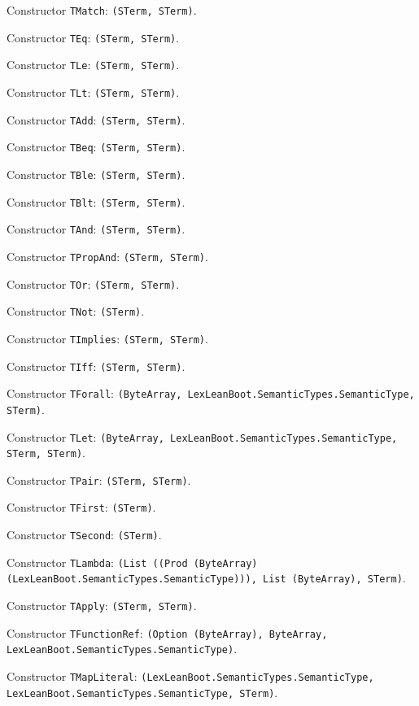 \documentclass[11pt]{article}
\begin{document}
\noindent Constructor \texttt{TMatch}: \texttt{(STerm, STerm)}.\par
\noindent Constructor \texttt{TEq}: \texttt{(STerm, STerm)}.\par
\noindent Constructor \texttt{TLe}: \texttt{(STerm, STerm)}.\par
\noindent Constructor \texttt{TLt}: \texttt{(STerm, STerm)}.\par
\noindent Constructor \texttt{TAdd}: \texttt{(STerm, STerm)}.\par
\noindent Constructor \texttt{TBeq}: \texttt{(STerm, STerm)}.\par
\noindent Constructor \texttt{TBle}: \texttt{(STerm, STerm)}.\par
\noindent Constructor \texttt{TBlt}: \texttt{(STerm, STerm)}.\par
\noindent Constructor \texttt{TAnd}: \texttt{(STerm, STerm)}.\par
\noindent Constructor \texttt{TPropAnd}: \texttt{(STerm, STerm)}.\par
\noindent Constructor \texttt{TOr}: \texttt{(STerm, STerm)}.\par
\noindent Constructor \texttt{TNot}: \texttt{(STerm)}.\par
\noindent Constructor \texttt{TImplies}: \texttt{(STerm, STerm)}.\par
\noindent Constructor \texttt{TIff}: \texttt{(STerm, STerm)}.\par
\noindent Constructor \texttt{TForall}: \texttt{(ByteArray, LexLeanBoot.SemanticTypes.SemanticType, STerm)}.\par
\noindent Constructor \texttt{TLet}: \texttt{(ByteArray, LexLeanBoot.SemanticTypes.SemanticType, STerm, STerm)}.\par
\noindent Constructor \texttt{TPair}: \texttt{(STerm, STerm)}.\par
\noindent Constructor \texttt{TFirst}: \texttt{(STerm)}.\par
\noindent Constructor \texttt{TSecond}: \texttt{(STerm)}.\par
\noindent Constructor \texttt{TLambda}: \texttt{(List ((Prod (ByteArray) (LexLeanBoot.SemanticTypes.SemanticType))), List (ByteArray), STerm)}.\par
\noindent Constructor \texttt{TApply}: \texttt{(STerm, STerm)}.\par
\noindent Constructor \texttt{TFunctionRef}: \texttt{(Option (ByteArray), ByteArray, LexLeanBoot.SemanticTypes.SemanticType)}.\par
\noindent Constructor \texttt{TMapLiteral}: \texttt{(LexLeanBoot.SemanticTypes.SemanticType, LexLeanBoot.SemanticTypes.SemanticType, STerm)}.\par
\end{document}

